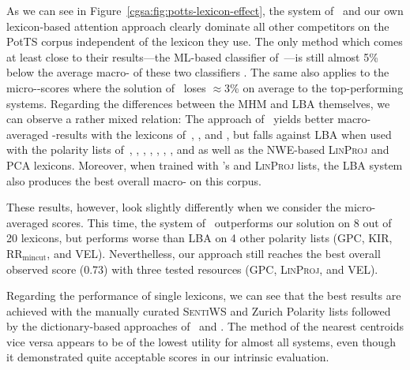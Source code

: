As we can see in Figure~\ref{cgsa:fig:potts-lexicon-effect}, the
system of~\citet{Mohammad:13} and our own lexicon-based attention
approach clearly dominate all other competitors on the PotTS corpus
independent of the lexicon they use.  The only method which comes at
least close to their results---the ML-based classifier
of~\citet{Guenther:14}---is still almost 5\% below the average
macro-\F{} of these two classifiers .  The same also applies to the
micro-\F-scores where the solution of~\citet{Guenther:14} loses
$\approx$3\% on average to the top-performing systems.  Regarding the
differences between the MHM and LBA themselves, we can observe a
rather mixed relation: The approach of~\citet{Mohammad:13} yields
better macro-averaged \F{}-results with the lexicons
of~\citet{Esuli:05}, \citet{Vo:16}, and \citet{Clematide:10}, but
falls against LBA when used with the polarity lists
of~\citet{Blair-Goldensohn:08}, \citet{Waltinger:10}, \citet{Hu:04},
\citet{Kiritchenko:14}, \citet{Rao:09}, \citet{Takamura:05},
\citet{Tang:14}, and \citet{Velikovich:10} as well as the NWE-based
\textsc{LinProj} and \textsc{PCA} lexicons.  Moreover, when trained
with \citeauthor{Tang:14}'s and \textsc{LinProj} lists, the LBA system
also produces the best overall macro-\F{} on this corpus.

These results, however, look slightly differently when we consider the
micro-averaged scores. This time, the system
of~\citeauthor{Mohammad:13} outperforms our solution on 8 out of 20
lexicons, but performs worse than LBA on 4 other polarity lists (GPC,
KIR, RR$_{\textrm{mincut}}$, and VEL).  Neverthelless, our approach
still reaches the best overall observed score (0.73) with three tested
resources (GPC, \textsc{LinProj}, and VEL).

Regarding the performance of single lexicons, we can see that the best
results are achieved with the manually curated \textsc{SentiWS} and
Zurich Polarity lists \cite{Remus:10,Clematide:10} followed by the
dictionary-based approaches of~\citet{Blair-Goldensohn:08} and
\citet{Rao:09}.  The method of the nearest centroids vice versa
appears to be of the lowest utility for almost all systems, even
though it demonstrated quite acceptable scores in our intrinsic
evaluation.

